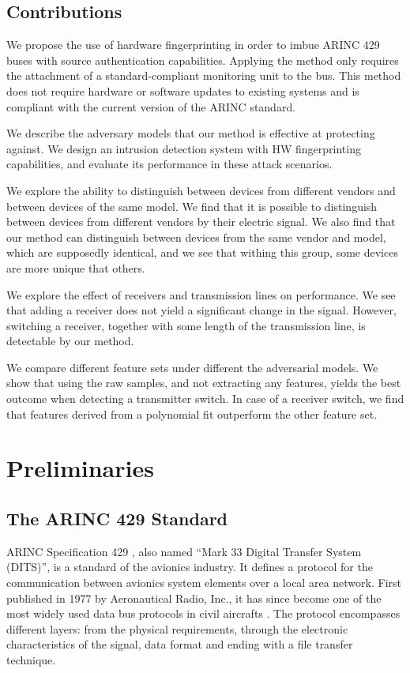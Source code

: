 \documentclass[conference]{IEEEtran}
\begin{document}
\subsection{Contributions}
  We propose the use of hardware fingerprinting in order to imbue ARINC 429 buses with source authentication capabilities. Applying the method only requires the attachment of a standard-compliant monitoring unit to the bus. This method does not require hardware or software updates to existing systems and is compliant with the current version of the ARINC standard.
  
  We describe the adversary models that our method is effective at protecting against. We design an intrusion detection system with HW fingerprinting capabilities, and evaluate its performance in these attack scenarios.
  
  We explore the ability to distinguish between devices from different vendors and between devices of the same model. We find that it is possible to distinguish between devices from different vendors by their electric signal. We also find that our method can distinguish between devices from the same vendor and model, which are supposedly identical, and we see that withing this group, some devices are more unique that others.
  
  We explore the effect of receivers and transmission lines on performance. We see that adding a receiver does not yield a significant change in the signal. However, switching a receiver, together with some length of the transmission line, is detectable by our method.
  
  We compare different feature sets under different the adversarial models. We show that using the raw samples, and not extracting any features, yields the best outcome when detecting a transmitter switch. In case of a receiver switch, we find that features derived from a polynomial fit outperform the other feature set.
  
\section{Preliminaries}
\subsection{The ARINC 429 Standard}
  ARINC Specification 429 \cite{arinc2004arinc429}, also named ``Mark 33 Digital Transfer System (DITS)'', is a standard of the avionics industry. It defines a protocol for the communication between avionics system elements over a local area network. First published in 1977 by Aeronautical Radio, Inc., it has since become one of the most widely used data bus protocols in civil aircrafts \cite{MoirIan2013DBN}. The protocol encompasses different layers: from the physical requirements, through the electronic characteristics of the signal, data format and ending with a file transfer technique.
\end{document}
